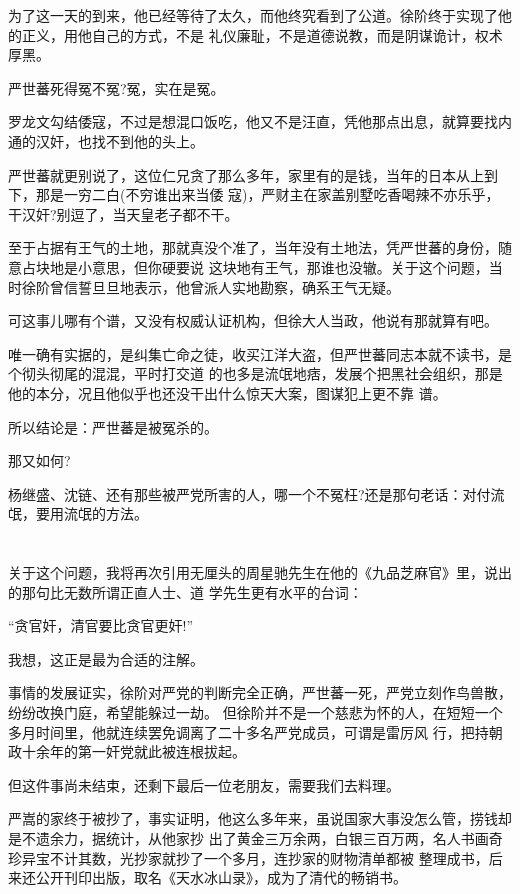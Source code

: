 \documentclass[11pt,a4paper,onecolumn]{article}
\begin{document}
为了这一天的到来，他已经等待了太久，而他终究看到了公道。徐阶终于实现了他的正义，用他自己的方式，不是
礼仪廉耻，不是道德说教，而是阴谋诡计，权术厚黑。

严世蕃死得冤不冤?冤，实在是冤。

罗龙文勾结倭寇，不过是想混口饭吃，他又不是汪直，凭他那点出息，就算要找内通的汉奸，也找不到他的头上。

严世蕃就更别说了，这位仁兄贪了那么多年，家里有的是钱，当年的日本从上到下，那是一穷二白(不穷谁出来当倭
寇)，严财主在家盖别墅吃香喝辣不亦乐乎，干汉奸?别逗了，当天皇老子都不干。

至于占据有王气的土地，那就真没个准了，当年没有土地法，凭严世蕃的身份，随意占块地是小意思，但你硬要说
这块地有王气，那谁也没辙。关于这个问题，当时徐阶曾信誓旦旦地表示，他曾派人实地勘察，确系王气无疑。

可这事儿哪有个谱，又没有权威认证机构，但徐大人当政，他说有那就算有吧。

唯一确有实据的，是纠集亡命之徒，收买江洋大盗，但严世蕃同志本就不读书，是个彻头彻尾的混混，平时打交道
的也多是流氓地痞，发展个把黑社会组织，那是他的本分，况且他似乎也还没干出什么惊天大案，图谋犯上更不靠
谱。

所以结论是：严世蕃是被冤杀的。

那又如何?

杨继盛、沈链、还有那些被严党所害的人，哪一个不冤枉?还是那句老话：对付流氓，要用流氓的方法。

\section[\thesection]{}

关于这个问题，我将再次引用无厘头的周星驰先生在他的《九品芝麻官》里，说出的那句比无数所谓正直人士、道
学先生更有水平的台词：

``贪官奸，清官要比贪官更奸!''

我想，这正是最为合适的注解。

事情的发展证实，徐阶对严党的判断完全正确，严世蕃一死，严党立刻作鸟兽散，纷纷改换门庭，希望能躲过一劫。
但徐阶并不是一个慈悲为怀的人，在短短一个多月时间里，他就连续罢免调离了二十多名严党成员，可谓是雷厉风
行，把持朝政十余年的第一奸党就此被连根拔起。

但这件事尚未结束，还剩下最后一位老朋友，需要我们去料理。

严嵩的家终于被抄了，事实证明，他这么多年来，虽说国家大事没怎么管，捞钱却是不遗余力，据统计，从他家抄
出了黄金三万余两，白银三百万两，名人书画奇珍异宝不计其数，光抄家就抄了一个多月，连抄家的财物清单都被
整理成书，后来还公开刊印出版，取名《天水冰山录》，成为了清代的畅销书。
\end{document}
